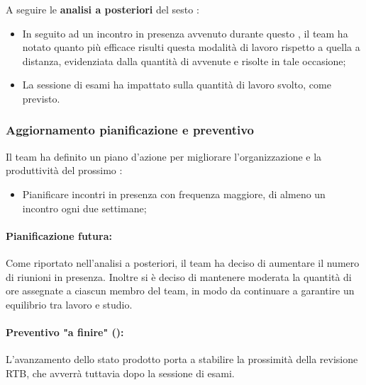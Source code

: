 \vspace{0.5\baselineskip}
\par A seguire le \textbf{analisi a posteriori} del sesto :
\begin{itemize}
  \item In seguito ad un incontro in presenza avvenuto durante questo , il team ha notato quanto più efficace risulti questa modalità di lavoro rispetto a quella a distanza, evidenziata dalla quantità di  avvenute e risolte in tale occasione;
  \item La sessione di esami ha impattato sulla quantità di lavoro svolto, come previsto.
\end{itemize}

\subsubsection{Aggiornamento pianificazione e preventivo}
\par Il team ha definito un piano d'azione per migliorare l'organizzazione e la produttività del prossimo :
\begin{itemize}
  \item Pianificare incontri in presenza con frequenza maggiore, di almeno un incontro ogni due settimane;
\end{itemize}

\paragraph*{Pianificazione futura:}
\par Come riportato nell'analisi a posteriori, il team ha deciso di aumentare il numero di riunioni in presenza.
Inoltre si è deciso di mantenere moderata la quantità di ore assegnate a ciascun membro del team, in modo da continuare a garantire un equilibrio tra lavoro e studio.

\paragraph*{Preventivo "a finire" ():}
\par L'avanzamento dello stato prodotto porta a stabilire la prossimità della revisione RTB, che avverrà tuttavia dopo la sessione di esami.

